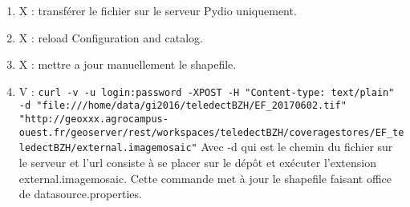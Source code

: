 \documentclass[10pt,a4paper]{article}
\begin{document}
\begin{enumerate}
\item X : transférer le fichier sur le serveur Pydio uniquement.
\item X : reload Configuration and catalog.
\item X : mettre a jour manuellement le shapefile.
\item V : \verb!curl -v -u login:password -XPOST -H "Content-type: text/plain" -d "file:///home/data/gi2016/teledectBZH/EF_20170602.tif" "http://geoxxx.agrocampus-ouest.fr/geoserver/rest/workspaces/teledectBZH/coveragestores/EF_teledectBZH/external.imagemosaic"! \smallbreak
Avec -d qui est le chemin du fichier sur le serveur et l'url consiste à se placer sur le dépôt et exécuter l'extension external.imagemosaic. Cette commande met à jour le shapefile faisant office de datasource.properties.
\end{enumerate}
\end{document}
